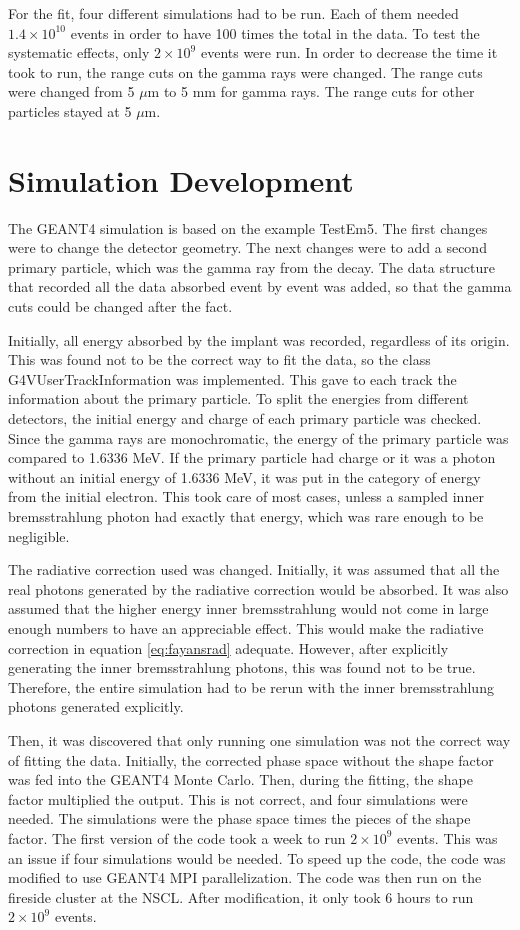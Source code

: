 \documentclass[../MaxHughesThesis.tex]{subfiles}
\begin{document}
For the fit, four different simulations had to be run.
Each of them needed $1.4 \times 10^{10}$ events in order to have 100 times the total in the data.
To test the systematic effects, only $2 \times 10^{9}$ events were run.
In order to decrease the time it took to run, the range cuts on the gamma rays were changed.
The range cuts were changed from 5 $\mu$m to 5 mm for gamma rays.
The range cuts for other particles stayed at 5 $\mu$m.

\section{Simulation Development}
The GEANT4 simulation is based on the example TestEm5.
The first changes were to change the detector geometry. 
The next changes were to add a second primary particle, which was the gamma ray from the decay.
The data structure that recorded all the data absorbed event by event was added, so that the gamma cuts could be changed after the fact.

Initially, all energy absorbed by the implant was recorded, regardless of its origin.
This was found not to be the correct way to fit the data, so the class G4VUserTrackInformation was implemented.
This gave to each track the information about the primary particle.
To split the energies from different detectors, the initial energy and charge of each primary particle was checked.
Since the gamma rays are monochromatic, the energy of the primary particle was compared to 1.6336 MeV.
If the primary particle had charge or it was a photon without an initial energy of 1.6336 MeV, it was put in the category of energy from the initial electron. 
This took care of most cases, unless a sampled inner bremsstrahlung photon had exactly that energy, which was rare enough to be negligible.

The radiative correction used was changed.
Initially, it was assumed that all the real photons generated by the radiative correction would be absorbed.
It was also assumed that the higher energy inner bremsstrahlung would not come in large enough numbers to have an appreciable effect. 
This would make the radiative correction in equation \ref{eq:fayansrad} adequate. 
However, after explicitly generating the inner bremsstrahlung photons, this was found not to be true.
Therefore, the entire simulation had to be rerun with the inner bremsstrahlung photons generated explicitly.

Then, it was discovered that only running one simulation was not the correct way of fitting the data.
Initially, the corrected phase space without the shape factor was fed into the GEANT4 Monte Carlo.
Then, during the fitting, the shape factor multiplied the output. 
This is not correct, and four simulations were needed.
The simulations were the phase space times the pieces of the shape factor.
The first version of the code took a week to run $2 \times 10^{9}$ events.
This was an issue if four simulations would be needed.
To speed up the code, the code was modified to use GEANT4 MPI parallelization.
The code was then run on the fireside cluster at the NSCL.
After modification, it only took 6 hours to run $2 \times 10^{9}$ events.
\end{document}
